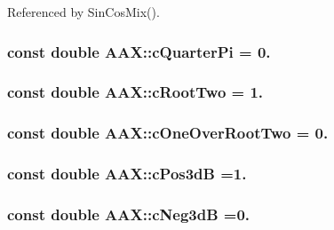 Referenced by Sin\+Cos\+Mix().

\hypertarget{a00288_ad4d53f57051266ed14dc1632e95cb04e}{}
\subsubsection[{c\+Quarter\+Pi}]{\setlength{\rightskip}{0pt plus 5cm}const double A\+A\+X\+::c\+Quarter\+Pi = 0.}\label{a00288_ad4d53f57051266ed14dc1632e95cb04e}
\hypertarget{a00288_af5ff0caa18f36334fd5c52e97f4a0cad}{}
\subsubsection[{c\+Root\+Two}]{\setlength{\rightskip}{0pt plus 5cm}const double A\+A\+X\+::c\+Root\+Two = 1.}\label{a00288_af5ff0caa18f36334fd5c52e97f4a0cad}
\hypertarget{a00288_a0ae4975165aaf788ed120dbdd82a3cd7}{}
\subsubsection[{c\+One\+Over\+Root\+Two}]{\setlength{\rightskip}{0pt plus 5cm}const double A\+A\+X\+::c\+One\+Over\+Root\+Two = 0.}\label{a00288_a0ae4975165aaf788ed120dbdd82a3cd7}
\hypertarget{a00288_ad25c51177cb216caae3b4747b028d8ba}{}
\subsubsection[{c\+Pos3d\+B}]{\setlength{\rightskip}{0pt plus 5cm}const double A\+A\+X\+::c\+Pos3d\+B =1.}\label{a00288_ad25c51177cb216caae3b4747b028d8ba}
\hypertarget{a00288_af6f212fd5bb0df08db615fffe4445a3d}{}
\subsubsection[{c\+Neg3d\+B}]{\setlength{\rightskip}{0pt plus 5cm}const double A\+A\+X\+::c\+Neg3d\+B =0.}\label{a00288_af6f212fd5bb0df08db615fffe4445a3d}
\hypertarget{a00288_aade00875e4e88b00d991197f574c42ed}{}
